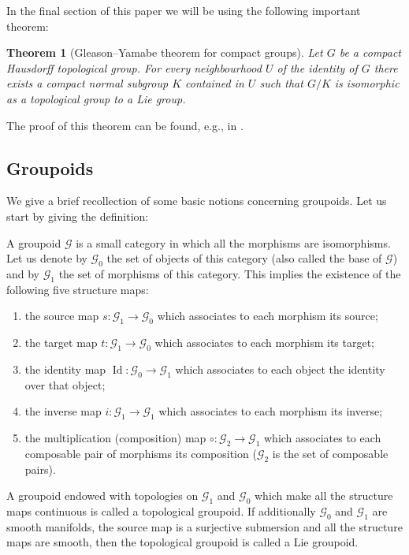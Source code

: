 \documentclass[11pt]{article}
\newtheorem{tw}{Theorem}[section]
\begin{document}
In the final section of this paper we will be using the following important theorem:
\begin{tw}[Gleason--Yamabe theorem for compact groups] \label{GY}Let $G$ be a compact Hausdorff topological group. For every neighbourhood $U$ of the identity of $G$ there exists a compact normal subgroup $K$ contained in $U$ such that $G\slash K$ is isomorphic as a topological group to a Lie group.
\end{tw}
The proof of this theorem can be found, e.g., in \cite[Theorem~1.4.14]{TT}.

\subsection{Groupoids}
We give a brief recollection of some basic notions concerning groupoids. Let us start by giving the definition:
\begin{defi} A groupoid $\mathcal{G}$ is a small category in which all the morphisms are isomorphisms. Let us denote by $\mathcal{G}_0$ the set of objects of this category (also called the base of $\mathcal{G}$) and by $\mathcal{G}_1$ the set of morphisms of this category. This implies the existence of the following five structure maps:
\begin{enumerate}\itemsep=0pt
\item[1)] the source map $s\colon \mathcal{G}_1\rightarrow\mathcal{G}_0$ which associates to each morphism its source;
\item[2)] the target map $t\colon \mathcal{G}_1\rightarrow\mathcal{G}_0$ which associates to each morphism its target;
\item[3)] the identity map $\operatorname{Id}\colon \mathcal{G}_0\rightarrow\mathcal{G}_1$ which associates to each object the identity over that object;
\item[4)] the inverse map $i\colon \mathcal{G}_1\rightarrow\mathcal{G}_1$ which associates to each morphism its inverse;
\item[5)] the multiplication (composition) map $\circ\colon \mathcal{G}_2\rightarrow\mathcal{G}_1$ which associates to each composable pair of morphisms its composition ($\mathcal{G}_2$ is the set of composable pairs).
\end{enumerate}
 A groupoid endowed with topologies on $\mathcal{G}_1$ and $\mathcal{G}_0$ which make all the structure maps continuous is called a topological groupoid. If additionally $\mathcal{G}_0$ and $\mathcal{G}_1$ are smooth manifolds, the source map is a surjective submersion and all the structure maps are smooth, then the topological groupoid is called a Lie groupoid.
\end{defi}
\end{document}
